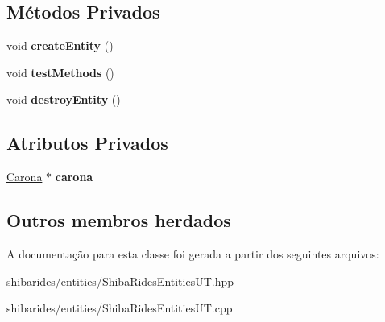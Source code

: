 \subsection*{Métodos Privados}
\begin{DoxyCompactItemize}
\item 
void {\bfseries create\+Entity} ()\hypertarget{classshibarides_1_1TUCarona_a37d1b8d44171407c3b26f7b68561a952}{}\label{classshibarides_1_1TUCarona_a37d1b8d44171407c3b26f7b68561a952}

\item 
void {\bfseries test\+Methods} ()\hypertarget{classshibarides_1_1TUCarona_a362022eb77c3b61b630e00580cf12f07}{}\label{classshibarides_1_1TUCarona_a362022eb77c3b61b630e00580cf12f07}

\item 
void {\bfseries destroy\+Entity} ()\hypertarget{classshibarides_1_1TUCarona_a1b281d4e9498bff24112d9aebe59c825}{}\label{classshibarides_1_1TUCarona_a1b281d4e9498bff24112d9aebe59c825}

\end{DoxyCompactItemize}
\subsection*{Atributos Privados}
\begin{DoxyCompactItemize}
\item 
\hyperlink{classshibarides_1_1Carona}{Carona} $\ast$ {\bfseries carona}\hypertarget{classshibarides_1_1TUCarona_ac8fe3dab16c78e6436e1b0750aced08b}{}\label{classshibarides_1_1TUCarona_ac8fe3dab16c78e6436e1b0750aced08b}

\end{DoxyCompactItemize}
\subsection*{Outros membros herdados}


A documentação para esta classe foi gerada a partir dos seguintes arquivos\+:\begin{DoxyCompactItemize}
\item 
shibarides/entities/Shiba\+Rides\+Entities\+U\+T.\+hpp\item 
shibarides/entities/Shiba\+Rides\+Entities\+U\+T.\+cpp\end{DoxyCompactItemize}
